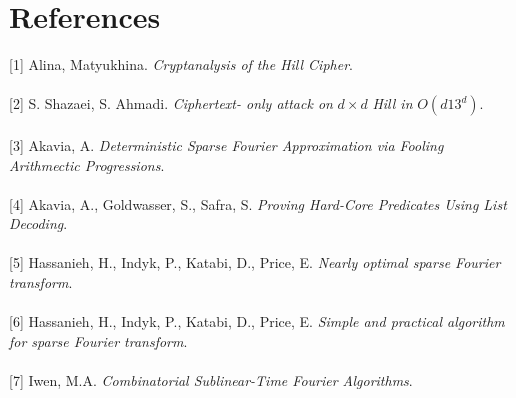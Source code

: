 \documentclass{article}
\begin{document}
\section{References}

[1] Alina, Matyukhina. \textit{Cryptanalysis of the Hill Cipher}.\\
\\[0pt]
[2] S. Shazaei, S. Ahmadi. \textit{Ciphertext- only attack on} $d \times d$ \textit{Hill in} $O(d13^d)$.\\
\\[0pt]
[3] Akavia, A. \textit{Deterministic Sparse Fourier Approximation via Fooling Arithmectic Progressions}.\\
\\[0pt]
[4] Akavia, A., Goldwasser, S., Safra, S. \textit{Proving Hard-Core Predicates Using List Decoding}.\\
\\[0pt]
[5] Hassanieh, H., Indyk, P., Katabi, D., Price, E. \textit{Nearly optimal sparse Fourier transform}.\\
\\[0pt]
[6] Hassanieh, H., Indyk, P., Katabi, D., Price, E. \textit{Simple and practical algorithm for sparse Fourier transform}.\\
\\[0pt]
[7] Iwen, M.A. \textit{Combinatorial Sublinear-Time Fourier Algorithms}.\\
\end{document}
